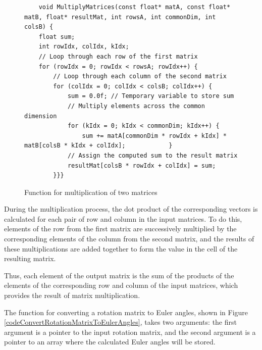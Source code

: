 \begin{figure}[H]
	\centering
	\begin{verbatim}
    void MultiplyMatrices(const float* matA, const float* matB, float* resultMat, int rowsA, int commonDim, int colsB) {
    float sum;
    int rowIdx, colIdx, kIdx;
    // Loop through each row of the first matrix
    for (rowIdx = 0; rowIdx < rowsA; rowIdx++) {
        // Loop through each column of the second matrix
        for (colIdx = 0; colIdx < colsB; colIdx++) {
            sum = 0.0f; // Temporary variable to store sum
            // Multiply elements across the common dimension
            for (kIdx = 0; kIdx < commonDim; kIdx++) {
                sum += matA[commonDim * rowIdx + kIdx] * matB[colsB * kIdx + colIdx];            }
            // Assign the computed sum to the result matrix
            resultMat[colsB * rowIdx + colIdx] = sum;
        }}}
	\end{verbatim}
	\caption{Function for multiplication of two matrices}\label{codematrix}
\end{figure}
During the multiplication process, the dot product of the corresponding vectors is calculated for each pair of row and column in the input matrices. To do this, elements of the row from the first matrix are successively multiplied by the corresponding elements of the column from the second matrix, and the results of these multiplications are added together to form the value in the cell of the resulting matrix.

Thus, each element of the output matrix is the sum of the products of the elements of the corresponding row and column of the input matrices, which provides the result of matrix multiplication.

The function for converting a rotation matrix to Euler angles, shown in Figure \ref{codeConvertRotationMatrixToEulerAngles}, takes two arguments: the first argument is a pointer to the input rotation matrix, and the second argument is a pointer to an array where the calculated Euler angles will be stored.


